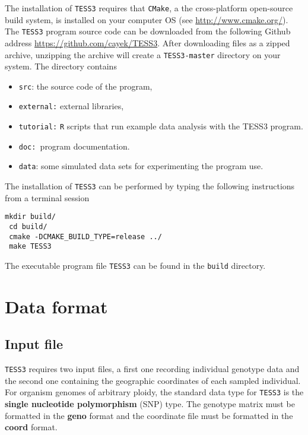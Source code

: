 \documentclass[10pt,a4paper]{article}
\begin{document}
The installation of {\tt TESS3} requires that {\tt CMake}, a the cross-platform open-source build system, is installed on your computer OS (see \url{ http://www.cmake.org/}).  The {\tt TESS3}  program source code can be downloaded from the following Github address \url{https://github.com/cayek/TESS3}. After downloading files as a zipped archive, unzipping the archive will create a {\tt TESS3-master} directory on your system. The  directory contains 
\begin{itemize}
\item   {\tt src}: the source code of the program,

\item   {\tt external:} external libraries,

\item   {\tt tutorial:} {\tt R} scripts that run example data analysis with the TESS3 program.

\item     {\tt doc: }program documentation.

\item     {\tt data}: some simulated data sets for experimenting the program use.
\end{itemize}
\noindent The installation of {\tt TESS3} can be performed by typing the following instructions from a terminal session 

\begin{Verbatim}[frame = single]
 mkdir build/
 cd build/
 cmake -DCMAKE_BUILD_TYPE=release ../
 make TESS3
\end{Verbatim}

 \noindent The executable program file {\tt TESS3} can be found in the {\tt build} directory.  
  
\section{Data format}

\subsection{Input file}

{\tt TESS3} requires two input files, a first one recording individual genotype data and the second one containing the geographic coordinates of  each sampled individual. For organism genomes of arbitrary ploidy, the standard data type for {\tt TESS3} is the {\bf single nucleotide polymorphism} (SNP) type.  The genotype matrix must be formatted in the {\bf geno} format and the coordinate file must be formatted in the {\bf coord} format.
\end{document}
